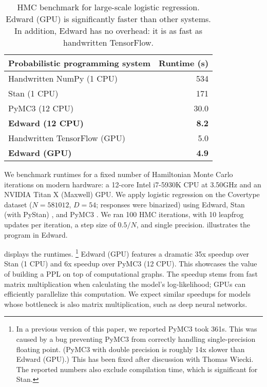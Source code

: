 \begin{table}[tb]
\centering
\begin{tabular}{lr}
\toprule
Probabilistic programming system & Runtime (s)
\\
\midrule
Handwritten NumPy (1 CPU) & 534 \\
Stan (1 CPU) \citep{carpenter2016stan} & 171 \\
PyMC3 (12 CPU) \citep{salvatier2015probabilistic} & 30.0 \\
\textbf{Edward (12 CPU)} & \textbf{8.2} \\
Handwritten TensorFlow (GPU) & 5.0 \\
\textbf{Edward (GPU)} & \textbf{4.9}\\
\bottomrule
\end{tabular}
\caption{\gls{HMC} benchmark for large-scale logistic regression.
Edward (GPU) is significantly faster than other systems. In addition,
Edward has no overhead: it is as fast as handwritten TensorFlow.}
\label{table:hmc}
\end{table}

We benchmark runtimes for
a fixed number of Hamiltonian Monte Carlo \citep[\gls{HMC};][]{neal2011mcmc}
iterations on modern
hardware: a 12-core Intel i7-5930K CPU
at 3.50GHz and an NVIDIA Titan X (Maxwell) GPU. We apply
logistic regression on the
Covertype dataset ($N=581012$, $D=54$; responses were
binarized)
using Edward,
Stan (with PyStan) \citep{carpenter2016stan}, and PyMC3
\citep{salvatier2015probabilistic}.
We ran 100 \gls{HMC} iterations,
with 10 leapfrog updates per iteration, a step size of $0.5 / N$, and
single precision.
 illustrates the program in Edward.

 displays the runtimes.%
\footnote{In a previous version of this paper, we reported PyMC3 took 361s. This was
caused by a bug preventing PyMC3 from correctly handling
single-precision floating point. (PyMC3 with double precision is roughly 14x slower than Edward (GPU).) This has been fixed
after discussion with Thomas Wiecki. The reported numbers also
exclude compilation time, which is significant for Stan.}
Edward (GPU) features a dramatic 35x speedup over Stan
(1 CPU) and 6x speedup over PyMC3 (12 CPU).
This showcases the value of building a \gls{PPL} on top of
computational graphs.
The speedup stems from fast matrix multiplication
when calculating the model's log-likelihood; GPUs can efficiently
parallelize this computation.
We expect similar speedups for models whose bottleneck is also matrix multiplication, such as deep neural networks.

